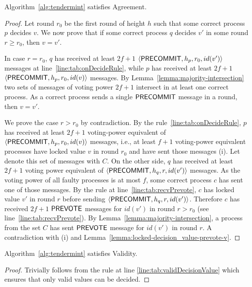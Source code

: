 \begin{lemma}
	\label{lemma:agreement}
	Algorithm~\ref{alg:tendermint} satisfies Agreement. 
\end{lemma}

\begin{proof}
Let round $r_0$ be the first round of height $h$ such that some correct process $p$ decides $v$. We now prove that if some correct process $q$ decides $v'$ in some round $r \ge r_0$, then $v = v'$.

In case $r = r_0$, $q$ has received at least $2f+1$ $\langle\mathsf{PRECOMMIT},h_p,r_0,id(v')\rangle$  messages at line~\ref{line:tab:onDecideRule},
while $p$ has received at least $2f+1$ $\langle\mathsf{PRECOMMIT},h_p,r_0,id(v)\rangle$ messages. 
By Lemma~\ref{lemma:majority-intersection} two sets of messages of voting power $2f+1$ intersect in at least one correct process.
As a correct process sends a single $\mathsf{PRECOMMIT}$ message in a round, then $v=v'$.

We prove the case $r > r_0$ by contradiction. By the rule~\ref{line:tab:onDecideRule}, $p$ has received at least $2f+1$ voting-power equivalent of $\langle\mathsf{PRECOMMIT},h_p,r_0,id(v)\rangle$ messages, i.e., at least $f+1$ voting-power equivalent processes 
have locked value $v$ in round $r_0$ and have sent those messages (i). Let denote this set of messages with $C$.
On the other side, $q$ has received at least $2f+1$ voting power equivalent of $\langle\mathsf{PRECOMMIT},h_q, r,id(v')\rangle$ messages. As the voting power of all faulty processes is at most $f$, some correct process $c$ has sent one of those messages. By the rule at line~\ref{line:tab:recvPrevote}, $c$ has locked value $v'$ in round $r$ before sending $\langle\mathsf{PRECOMMIT},h_q, r,id(v')\rangle$. Therefore $c$ has received $2f+1$ $\mathsf{PREVOTE}$ messages for $id(v')$ in round $r > r_0$ (see line~\ref{line:tab:recvPrevote}). By Lemma~\ref{lemma:majority-intersection}, a process from the set $C$ has sent $\mathsf{PREVOTE}$ message for $id(v')$ in round $r$. 
A contradiction with (i) and Lemma~\ref{lemma:locked-decision_value-prevote-v}.  
\end{proof}	

\begin{lemma}
	\label{lemma:agreement}
	Algorithm~\ref{alg:tendermint} satisfies Validity. 
\end{lemma}

\begin{proof}
Trivially follows from the rule at line \ref{line:tab:validDecisionValue} which ensures that only valid values can be decided. 
\end{proof}	

